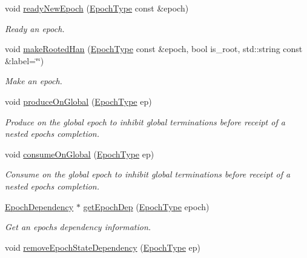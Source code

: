 \begin{DoxyCompactItemize}
void \hyperlink{structvt_1_1term_1_1_termination_detector_a93d5fd6eead47198c2ed4daaaf68c7ed}{ready\+New\+Epoch} (\hyperlink{namespacevt_a985a5adf291c34a3ca263b3378388236}{Epoch\+Type} const \&epoch)
\begin{DoxyCompactList}\small\item\em Ready an epoch. \end{DoxyCompactList}\item 
void \hyperlink{structvt_1_1term_1_1_termination_detector_ab8ed0e9dd8e865c318c98013a99cd8a1}{make\+Rooted\+Han} (\hyperlink{namespacevt_a985a5adf291c34a3ca263b3378388236}{Epoch\+Type} const \&epoch, bool is\+\_\+root, std\+::string const \&label=\char`\"{}\char`\"{})
\begin{DoxyCompactList}\small\item\em Make an epoch. \end{DoxyCompactList}\item 
void \hyperlink{structvt_1_1term_1_1_termination_detector_a34c4a04252832ddca7d6ffba7ffdda28}{produce\+On\+Global} (\hyperlink{namespacevt_a985a5adf291c34a3ca263b3378388236}{Epoch\+Type} ep)
\begin{DoxyCompactList}\small\item\em Produce on the global epoch to inhibit global terminations before receipt of a nested epoch\textquotesingle{}s completion. \end{DoxyCompactList}\item 
void \hyperlink{structvt_1_1term_1_1_termination_detector_aea24708f1cc8a70f7843061871e7a5b3}{consume\+On\+Global} (\hyperlink{namespacevt_a985a5adf291c34a3ca263b3378388236}{Epoch\+Type} ep)
\begin{DoxyCompactList}\small\item\em Consume on the global epoch to inhibit global terminations before receipt of a nested epoch\textquotesingle{}s completion. \end{DoxyCompactList}\item 
\hyperlink{structvt_1_1term_1_1_epoch_dependency}{Epoch\+Dependency} $\ast$ \hyperlink{structvt_1_1term_1_1_termination_detector_a34e823e14dcdd47e32c6eff45c3bf2de}{get\+Epoch\+Dep} (\hyperlink{namespacevt_a985a5adf291c34a3ca263b3378388236}{Epoch\+Type} epoch)
\begin{DoxyCompactList}\small\item\em Get an epoch\textquotesingle{}s dependency information. \end{DoxyCompactList}\item 
void \hyperlink{structvt_1_1term_1_1_termination_detector_aac9b76ef4345ca2c757f829a17bb7bfb}{remove\+Epoch\+State\+Dependency} (\hyperlink{namespacevt_a985a5adf291c34a3ca263b3378388236}{Epoch\+Type} ep)

\end{DoxyCompactItemize}
